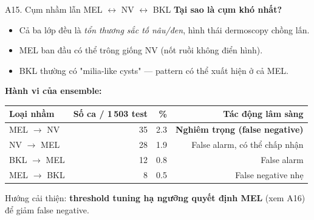 \documentclass[10pt, aspectratio=169]{beamer}
\begin{document}
\begin{frame}{A15. Cụm nhầm lẫn MEL $\leftrightarrow$ NV $\leftrightarrow$ BKL}
    \footnotesize
    \textbf{Tại sao là cụm khó nhất?}
    \begin{itemize}
        \item Cả ba lớp đều là \textit{tổn thương sắc tố nâu/đen}, hình thái dermoscopy chồng lấn.
        \item MEL ban đầu có thể trông giống NV (nốt ruồi không điển hình).
        \item BKL thường có "milia-like cysts" --- pattern có thể xuất hiện ở cả MEL.
    \end{itemize}

    \vspace{0.2cm}
    \textbf{Hành vi của ensemble:}
    \begin{table}[]
        \scriptsize \centering
        \begin{tabular}{lrrr}
        \toprule
        \rowcolor{usthblue!25} \textbf{Loại nhầm} & \textbf{Số ca / 1\,503 test} & \textbf{\%} & \textbf{Tác động lâm sàng} \\
        \midrule
        MEL $\rightarrow$ NV  & 35 & 2.3 & \textcolor{usthred}{\textbf{Nghiêm trọng (false negative)}} \\
        NV $\rightarrow$ MEL  & 28 & 1.9 & False alarm, có thể chấp nhận \\
        BKL $\rightarrow$ MEL & 12 & 0.8 & False alarm \\
        MEL $\rightarrow$ BKL & 8  & 0.5 & False negative nhẹ \\
        \bottomrule
        \end{tabular}
    \end{table}

    \vspace{0.1cm}
    Hướng cải thiện: \textbf{threshold tuning hạ ngưỡng quyết định MEL} (xem A16) để giảm false negative.
\end{frame}
\end{document}
